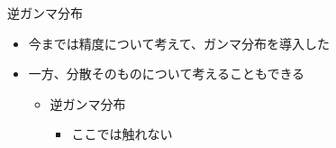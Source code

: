 

  \begin{frame}{逆ガンマ分布}
   \begin{itemize}
    \item 今までは精度について考えて、ガンマ分布を導入した
    \item 一方、分散そのものについて考えることもできる
          \begin{itemize}
           \item \alert{逆ガンマ分布}
                 \begin{itemize}
                  \item ここでは触れない
                 \end{itemize}
          \end{itemize}
   \end{itemize}
  \end{frame}

